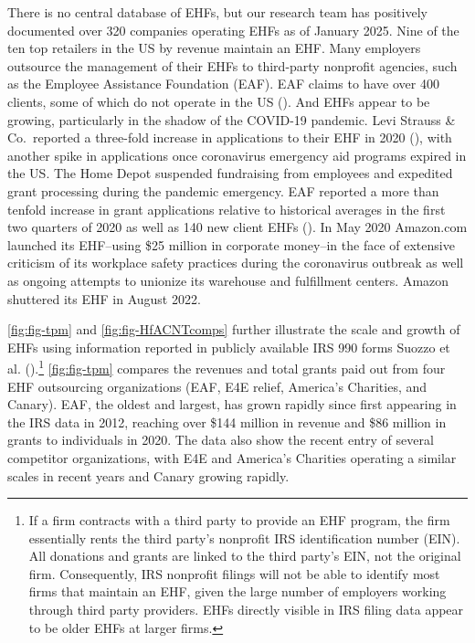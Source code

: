 \documentclass[
  11pt,
  oneside]{article}
\begin{document}
There is no central database of EHFs, but our research team has positively documented over 320 companies operating EHFs as of January 2025. Nine of the ten top retailers in the US by revenue maintain an EHF. Many employers outsource the management of their EHFs to third-party nonprofit agencies, such as the Employee Assistance Foundation (EAF). EAF claims to have over 400 clients, some of which do not operate in the US (). And EHFs appear to be growing, particularly in the shadow of the COVID-19 pandemic. Levi Strauss \& Co.~reported a three-fold increase in applications to their EHF in 2020 (), with another spike in applications once coronavirus emergency aid programs expired in the US. The Home Depot suspended fundraising from employees and expedited grant processing during the pandemic emergency. EAF reported a more than tenfold increase in grant applications relative to historical averages in the first two quarters of 2020 as well as 140 new client EHFs (). In May 2020 Amazon.com launched its EHF--using \$25 million in corporate money--in the face of extensive criticism of its workplace safety practices during the coronavirus outbreak as well as ongoing attempts to unionize its warehouse and fulfillment centers. Amazon shuttered its EHF in August 2022.

\ref{fig:fig-tpm} and \ref{fig:fig-HfACNTcomps} further illustrate the scale and growth of EHFs using information reported in publicly available IRS 990 forms Suozzo et al. ().\footnote{If a firm contracts with a third party to provide an EHF program, the firm essentially rents the third party's nonprofit IRS identification number (EIN). All donations and grants are linked to the third party's EIN, not the original firm. Consequently, IRS nonprofit filings will not be able to identify most firms that maintain an EHF, given the large number of employers working through third party providers. EHFs directly visible in IRS filing data appear to be older EHFs at larger firms.} \ref{fig:fig-tpm} compares the revenues and total grants paid out from four EHF outsourcing organizations (EAF, E4E relief, America's Charities, and Canary). EAF, the oldest and largest, has grown rapidly since first appearing in the IRS data in 2012, reaching over \$144 million in revenue and \$86 million in grants to individuals in 2020. The data also show the recent entry of several competitor organizations, with E4E and America's Charities operating a similar scales in recent years and Canary growing rapidly.
\end{document}
